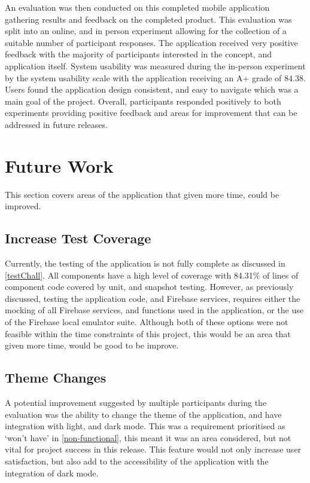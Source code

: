 An evaluation was then conducted on this completed mobile application gathering results and feedback on the completed product. This evaluation was split into an online, and in person experiment allowing for the collection of a suitable number of participant responses. The application received very positive feedback with the majority of participants interested in the concept, and application itself. System usability was measured during the in-person experiment by the system usability scale with the application receiving an A+ grade of 84.38. Users found the application design consistent, and easy to navigate which was a main goal of the project. Overall, participants responded positively to both experiments providing positive feedback and areas for improvement that can be addressed in future releases.  


\section{Future Work}
This section covers areas of the application that given more time, could be improved.
\subsection*{Increase Test Coverage}
Currently, the testing of the application is not fully complete as discussed in \ref{testChall}. All components have a high level of coverage with 84.31\% of lines of component code covered by unit, and snapshot testing. However, as previously discussed, testing the application code, and Firebase services, requires either the mocking of all Firebase services, and functions used in the application, or the use of the Firebase local emulator suite. Although both of these options were not feasible within the time constraints of this project, this would be an area that given more time, would be good to be improve.  

\subsection*{Theme Changes}
A potential improvement suggested by multiple participants during the evaluation was the ability to change the theme of the application, and have integration with light, and dark mode. This was a requirement prioritised as `won't have' in \ref{non-functional}, this meant it was an area considered, but not vital for project success in this release. This feature would not only increase user satisfaction, but also add to the accessibility of the application with the integration of dark mode.

